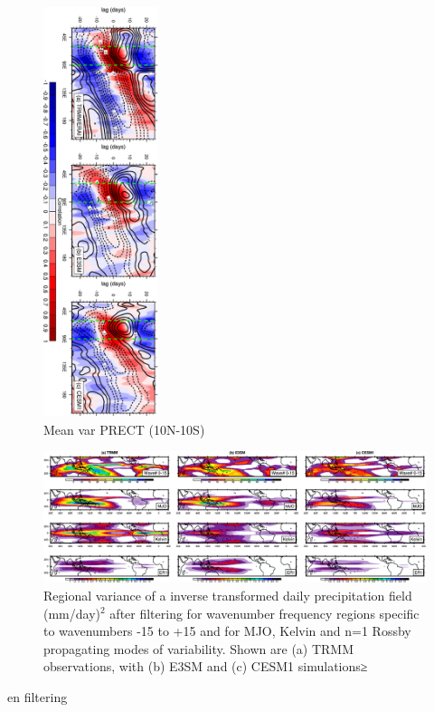 \documentclass[draft,ms]{AGUTeX}
\begin{document}
\begin{article}
\begin{figure}[t]
  \begin{center}
    \noindent\includegraphics[width=0.3\textwidth,angle=90.]{./figs/f_lagcorr_jja.pdf}
  \end{center}
  \caption{Mean var PRECT (10N-10S) } 
\label{f_lagcorr_jja}
\end{figure}

\begin{figure}[t]
  \begin{center}
    \noindent\includegraphics[width=1.1\textwidth,angle=0.]{./figs/f_wave_var_DJF_PRECT.pdf}
  \end{center}
  \caption{Regional variance of a inverse transformed daily precipitation field (mm/day)$^2$ after filtering for wavenumber frequency regions specific to wavenumbers -15 to +15 and for MJO, Kelvin and n=1 Rossby propagating modes of variability. Shown are (a) TRMM observations, with (b) E3SM and (c) CESM1 simulations≥} 
\label{f_wave_var_DJF_PRECT}
\end{figure}en filtering


\end{article}
\end{document}
